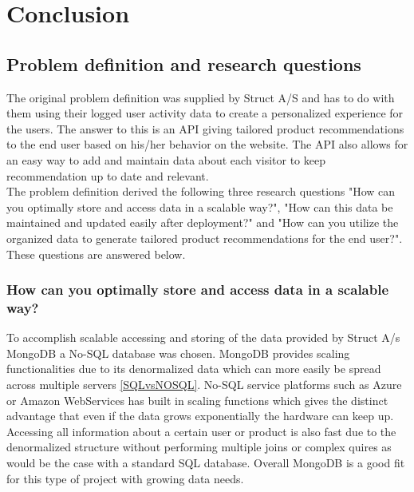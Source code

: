 
\chapter{Conclusion} %

\label{Chapter8} %


\section{Problem definition and research questions}

The original problem definition was supplied by Struct A/S and has to do with them using their logged user activity data to create a personalized experience for the users. The answer to this is an API giving tailored product recommendations to the end user based on his/her behavior on the website. The API also allows for an easy way to add and maintain data about each visitor to keep recommendation up to date and relevant. \\
The problem definition derived the following three research questions "How can you optimally store and access data in a scalable way?",  "How can this data be maintained and updated easily after deployment?" and "How can you utilize the organized data to generate tailored product recommendations for the end user?". These questions are answered below.

\subsection{How can you optimally store and access data in a scalable way?}
To accomplish scalable accessing and storing of the data provided by Struct A/s MongoDB a No-SQL database was chosen. MongoDB provides scaling functionalities due to its denormalized data which can more easily be spread across multiple servers \ref{SQLvsNOSQL}. No-SQL service platforms such as Azure or Amazon WebServices has built in scaling functions which gives the distinct advantage that even if the data grows exponentially the hardware can keep up. Accessing all information about a certain user or product is also fast due to the denormalized structure without performing multiple joins or complex quires as would be the case with a standard SQL database. Overall MongoDB is a good fit for this type of project with growing data needs.

